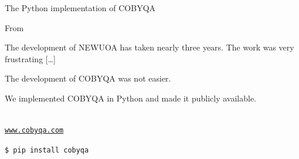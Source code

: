 \documentclass[optimization]{common/talk}
\begin{document}
\begin{frame}[fragile]{The Python implementation of COBYQA}
    \begin{block}{From \textcite{Powell_2006}}
        \begin{quoting}
            \small%
            The development of NEWUOA has taken nearly \alert{three years}.
            The work was very \alert{frustrating} [\dots]
        \end{quoting}
        The development of COBYQA was \alert{not easier}.
    \end{block}

    We implemented COBYQA in \alert{Python} and made it publicly available.

    \begin{center}
        \\[1ex]
        \href{https://www.cobyqa.com}{\texttt{www.cobyqa.com}}
    \end{center}

    \begin{block}{}
        \texttt{\$ pip install cobyqa}
    \end{block}


\end{frame}
\end{document}
